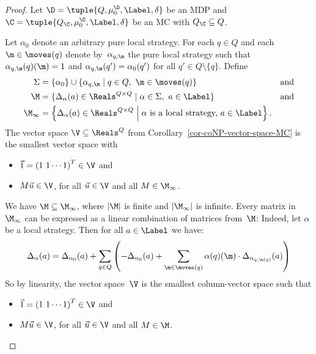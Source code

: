 \begin{proof}
Let $\D = \tuple{Q,\mu^{\D}_{0},\Label,\delta}$ be an MDP
and $\C = \tuple{Q_\C,\mu^{\C}_{0},\Label,\delta}$ be an MC with $Q_\C \subseteq Q$.

Let $\alpha_0$ denote an arbitrary pure local strategy.
For each $q \in Q$ and each $\m \in \moves(q)$ denote by~$\alpha_{q,\m}$ the pure local strategy such that $\alpha_{q,\m}(q)(\m) = 1$ and $\alpha_{q,\m}(q') = \alpha_0(q')$ for all $q' \in Q \setminus \{q\}$.
Define
\begin{align*}
\Sigma &= \{ \alpha_0 \} \cup \{ \alpha_{q,\m} \mid q \in Q, \ \m \in \moves(q) \} && \text{and} \\
 \M &= \{ \Delta_{\alpha}(a) \in \Reals^{Q \times Q} \mid \alpha \in \Sigma,\ a \in \Label\}
 && \text{and} \\
 \M_\infty &= \left\{ \Delta_\alpha(a) \in \Reals^{Q \times Q} \;\middle\vert\; \alpha \text{ is a local strategy, $a \in \Label$}\right\}.
\end{align*}
The vector space $\V \subseteq \Reals^Q$ from Corollary~\ref{cor-coNP-vector-space-MC} is the smallest vector space with
\begin{itemize}
\item
$\vec{1} = {(1 \ 1 \cdots 1)}^T \in \V$ and
\item $M \vec{u} \in \V$, for all $\vec{u} \in \V$ and all $M \in \M_\infty$.
\end{itemize}

\noindent
We have $\M \subseteq \M_\infty$, where $|\M|$ is finite and $|\M_\infty|$ is infinite.
Every matrix in~$\M_\infty$ can be expressed as a linear combination of matrices from~$\M$:
Indeed, let $\alpha$ be a local strategy.
Then for all $a \in \Label$ we have:
\[
 \Delta_\alpha(a) = \Delta_{\alpha_0}(a)
  + \sum_{q \in Q}
  \left( - \Delta_{\alpha_0}(a) +
   \sum_{\m \in \moves(q)}
      \alpha(q)(\m) \cdot \Delta_{\alpha_{q,\m(q)}}(a)
  \right)
\]
So by linearity, the vector space~$\V$ is the smallest column-vector space such that
\begin{itemize}
\item
$\vec{1} = {(1 \ 1 \cdots 1)}^T \in \V$ and
\item $M \vec{u} \in \V$, for all $\vec{u} \in \V$ and all $M \in \M$.
\end{itemize}


\end{proof}
